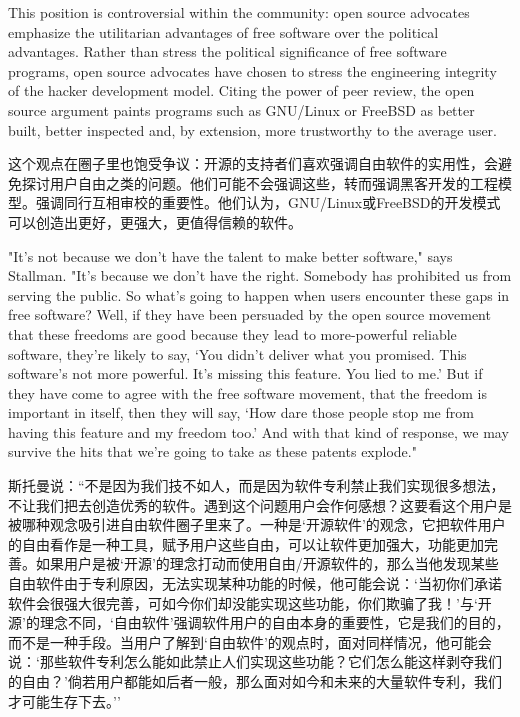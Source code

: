 \ifdefined\vtwo
\ifdefined\eng
This position is controversial within the community: open source advocates emphasize the utilitarian advantages of free software over the political advantages. Rather than stress the political significance of free software programs, open source advocates have chosen to stress the engineering integrity of the hacker development model. Citing the power of peer review, the open source argument paints programs such as GNU/Linux or FreeBSD as better built, better inspected and, by extension, more trustworthy to the average user.
\fi

\ifdefined\chs
这个观点在圈子里也饱受争议：开源的支持者们喜欢强调自由软件的实用性，会避免探讨用户自由之类的问题。他们可能不会强调这些，转而强调黑客开发的工程模型。强调同行互相审校的重要性。他们认为，GNU/Linux或FreeBSD的开发模式可以创造出更好，更强大，更值得信赖的软件。
\fi
\fi

\ifdefined\vone

\ifdefined\eng
"It's not because we don't have the talent to make better software," says Stallman. "It's because we don't have the right. Somebody has prohibited us from serving the public. So what's going to happen when users encounter these gaps in free software? Well, if they have been persuaded by the open source movement that these freedoms are good because they lead to more-powerful reliable software, they're likely to say, `You didn't deliver what you promised. This software's not more powerful. It's missing this feature. You lied to me.' But if they have come to agree with the free software movement, that the freedom is important in itself, then they will say, `How dare those people stop me from having this feature and my freedom too.' And with that kind of response, we may survive the hits that we're going to take as these patents explode." 
\fi

\ifdefined\chs
斯托曼说：``不是因为我们技不如人，而是因为软件专利禁止我们实现很多想法，不让我们把去创造优秀的软件。遇到这个问题用户会作何感想？这要看这个用户是被哪种观念吸引进自由软件圈子里来了。一种是`开源软件'的观念，它把软件用户的自由看作是一种工具，赋予用户这些自由，可以让软件更加强大，功能更加完善。如果用户是被`开源'的理念打动而使用自由/开源软件的，那么当他发现某些自由软件由于专利原因，无法实现某种功能的时候，他可能会说：`当初你们承诺软件会很强大很完善，可如今你们却没能实现这些功能，你们欺骗了我！'与`开源'的理念不同，`自由软件'强调软件用户的自由本身的重要性，它是我们的目的，而不是一种手段。当用户了解到`自由软件'的观点时，面对同样情况，他可能会说：`那些软件专利怎么能如此禁止人们实现这些功能？它们怎么能这样剥夺我们的自由？'倘若用户都能如后者一般，那么面对如今和未来的大量软件专利，我们才可能生存下去。''
\fi

